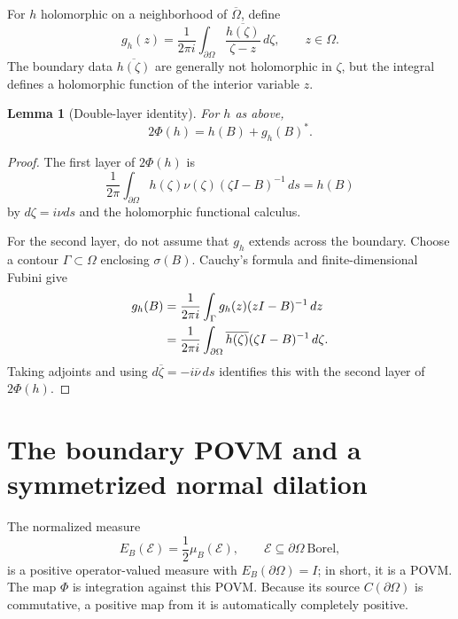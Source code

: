 \documentclass[11pt,oneside,openany]{book}
\newtheorem{lemma}[theorem]{Lemma}
\theoremstyle{definition}
\theoremstyle{remark}
\newcommand{\spec}{\sigma}
\begin{document}
For \(h\) holomorphic on a neighborhood of
\(\overline\Omega\), define
\begin{equation}
  g_h(z)=\frac{1}{2\pi i}
  \int_{\partial\Omega}
  \frac{\overline{h(\zeta)}}{\zeta-z}\,d\zeta,
  \qquad z\in\Omega.
  \label{eq:companion}
\end{equation}
The boundary data \(\overline{h(\zeta)}\) are generally not
holomorphic in \(\zeta\), but the integral defines a holomorphic
function of the interior variable \(z\).

\begin{lemma}[Double-layer identity]
\label{lem:double-layer}
For \(h\) as above,
\begin{equation}
  2\Phi(h)=h(B)+g_h(B)^*.
  \label{eq:double-layer-identity}
\end{equation}
\end{lemma}

\begin{proof}
The first layer of \(2\Phi(h)\) is
\[
  \frac{1}{2\pi}
  \int_{\partial\Omega}
  h(\zeta)\nu(\zeta)(\zeta I-B)^{-1}\,ds
  =h(B)
\]
by \(d\zeta=i\nu ds\) and the holomorphic functional calculus.

For the second layer, do not assume that \(g_h\) extends across the
boundary.  Choose a contour \(\Gamma\subset\Omega\) enclosing
\(\spec(B)\).  Cauchy's formula and finite-dimensional Fubini give
\begin{align}
  g_h(B)
  &=\frac{1}{2\pi i}\int_\Gamma
    g_h(z)(zI-B)^{-1}\,dz \notag\\
  &=\frac{1}{2\pi i}\int_{\partial\Omega}
    \overline{h(\zeta)}(\zeta I-B)^{-1}\,d\zeta.
  \label{eq:companion-at-B}
\end{align}
Taking adjoints and using
\(d\overline\zeta=-i\overline\nu\,ds\) identifies this with the
second layer of \(2\Phi(h)\).
\end{proof}

\section{The boundary POVM and a symmetrized normal dilation}

The normalized measure
\[
  E_B(\mathcal E)=\frac12\mu_B(\mathcal E),
  \qquad \mathcal E\subseteq\partial\Omega\ \text{Borel},
\]
is a positive operator-valued measure with \(E_B(\partial\Omega)=I\);
in short, it is a POVM.  The map \(\Phi\) is integration against this
POVM.  Because its source \(C(\partial\Omega)\) is commutative, a
positive map from it is automatically completely positive.
\end{document}
